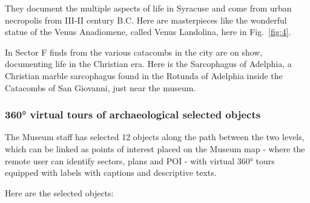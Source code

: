 \documentclass[amsthm,ebook]{saparticle}
\begin{document}
They document the multiple aspects of life in Syracuse and come from urban necropolis from III-II century B.C. Here are
masterpieces like the wonderful statue of the Venus Anadiomene, called Venus Landolina, here in Fig.~\ref{fig:4}.

In Sector F finds from the various catacombs in the city are on show, documenting life in the Christian era. Here is the
Sarcophagus of Adelphia, a Christian marble sarcophagus found in the Rotunda of Adelphia inside the Catacombs of San
Giovanni, just near the museum.




\subsubsection{360° virtual tours of archaeological selected objects}


The Museum staff has selected 12 objects along the path between the two levels, which can be linked as points of
interest placed on the Museum map - where the remote user can identify sectors, plans and POI - with virtual 360° tours
equipped with labels with captions and descriptive texts.

Here are the selected objects:
\end{document}
